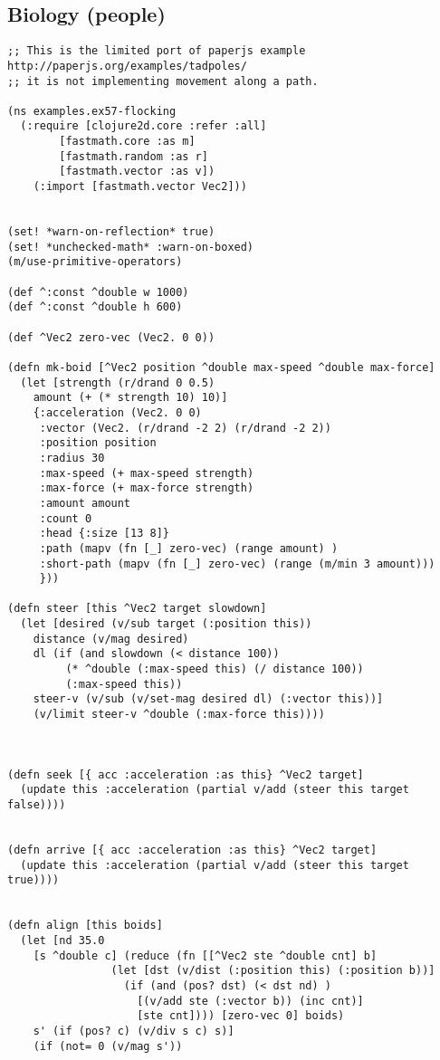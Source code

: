 \documentclass[11pt]{article}
\begin{document}
\subsection{Biology (people)}
\label{sec:org3638b88}
\begin{verbatim}
;; This is the limited port of paperjs example http://paperjs.org/examples/tadpoles/
;; it is not implementing movement along a path.

(ns examples.ex57-flocking
  (:require [clojure2d.core :refer :all]
	    [fastmath.core :as m]
	    [fastmath.random :as r]
	    [fastmath.vector :as v])
    (:import [fastmath.vector Vec2]))


(set! *warn-on-reflection* true)
(set! *unchecked-math* :warn-on-boxed)
(m/use-primitive-operators)

(def ^:const ^double w 1000)
(def ^:const ^double h 600)

(def ^Vec2 zero-vec (Vec2. 0 0))

(defn mk-boid [^Vec2 position ^double max-speed ^double max-force]
  (let [strength (r/drand 0 0.5)
	amount (+ (* strength 10) 10)]
    {:acceleration (Vec2. 0 0)
     :vector (Vec2. (r/drand -2 2) (r/drand -2 2))
     :position position
     :radius 30
     :max-speed (+ max-speed strength)
     :max-force (+ max-force strength)
     :amount amount
     :count 0
     :head {:size [13 8]}
     :path (mapv (fn [_] zero-vec) (range amount) )
     :short-path (mapv (fn [_] zero-vec) (range (m/min 3 amount)))
     }))

(defn steer [this ^Vec2 target slowdown]
  (let [desired (v/sub target (:position this))
	distance (v/mag desired)
	dl (if (and slowdown (< distance 100))
	     (* ^double (:max-speed this) (/ distance 100))
	     (:max-speed this))
	steer-v (v/sub (v/set-mag desired dl) (:vector this))]
    (v/limit steer-v ^double (:max-force this))))



(defn seek [{ acc :acceleration :as this} ^Vec2 target]
  (update this :acceleration (partial v/add (steer this target false))))


(defn arrive [{ acc :acceleration :as this} ^Vec2 target]
  (update this :acceleration (partial v/add (steer this target true))))


(defn align [this boids]
  (let [nd 35.0
	[s ^double c] (reduce (fn [[^Vec2 ste ^double cnt] b]
				(let [dst (v/dist (:position this) (:position b))]
				  (if (and (pos? dst) (< dst nd) )
				    [(v/add ste (:vector b)) (inc cnt)]
				    [ste cnt]))) [zero-vec 0] boids)
	s' (if (pos? c) (v/div s c) s)]
    (if (not= 0 (v/mag s'))


\end{verbatim}
\end{document}
